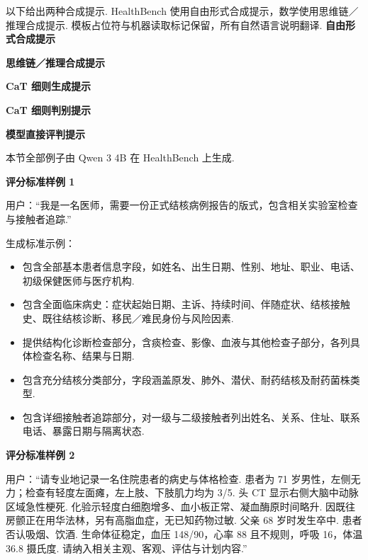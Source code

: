 以下给出两种合成提示. HealthBench 使用自由形式合成提示，数学使用思维链／推理合成提示. 模板占位符与机器读取标记保留，所有自然语言说明翻译.
\noindent\textbf{自由形式合成提示}\par
{}
\noindent\textbf{思维链／推理合成提示}\par
{}
\noindent\textbf{CaT 细则生成提示}\par
{}
\noindent\textbf{CaT 细则判别提示}\par
{}
\noindent\textbf{模型直接评判提示}\par
{}

本节全部例子由 Qwen 3 4B 在 HealthBench 上生成.

\noindent\textbf{评分标准样例 1}\par
用户：“我是一名医师，需要一份正式结核病例报告的版式，包含相关实验室检查与接触者追踪.”

生成标准示例：
\begin{itemize}
\item 包含全部基本患者信息字段，如姓名、出生日期、性别、地址、职业、电话、初级保健医师与医疗机构.
\item 包含全面临床病史：症状起始日期、主诉、持续时间、伴随症状、结核接触史、既往结核诊断、移民／难民身份与风险因素.
\item 提供结构化诊断检查部分，含痰检查、影像、血液与其他检查子部分，各列具体检查名称、结果与日期.
\item 包含充分结核分类部分，字段涵盖原发、肺外、潜伏、耐药结核及耐药菌株类型.
\item 包含详细接触者追踪部分，对一级与二级接触者列出姓名、关系、住址、联系电话、暴露日期与隔离状态.
\end{itemize}

\noindent\textbf{评分标准样例 2}\par
用户：“请专业地记录一名住院患者的病史与体格检查. 患者为 71 岁男性，左侧无力；检查有轻度左面瘫，左上肢、下肢肌力均为 3/5. 头 CT 显示右侧大脑中动脉区域急性梗死. 化验示轻度白细胞增多、血小板正常、凝血酶原时间略升. 因既往房颤正在用华法林，另有高脂血症，无已知药物过敏. 父亲 68 岁时发生卒中. 患者否认吸烟、饮酒. 生命体征稳定，血压 148/90，心率 88 且不规则，呼吸 16，体温 36.8 摄氏度. 请纳入相关主观、客观、评估与计划内容.”

